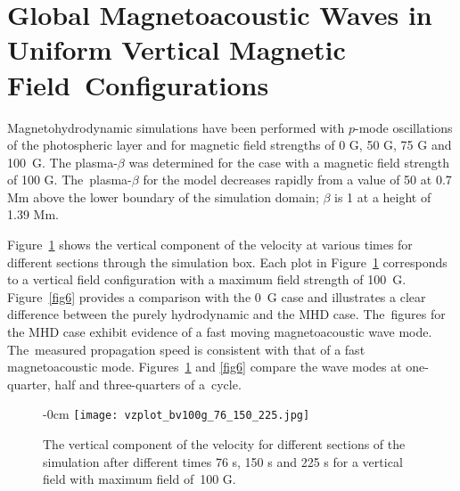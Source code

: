 \documentclass[physics,article,accept,pdftex,moreauthors]{Definitions/mdpi}
\begin{document}
\section{Global Magnetoacoustic Waves in Uniform Vertical Magnetic Field~Configurations}

Magnetohydrodynamic simulations have been performed with $p$-mode oscillations of the photospheric layer and for magnetic field strengths of 0 G, 50 G, 75 G and 100~G. The plasma-$\beta$ was determined for the case with a magnetic field strength of 100 G. The~plasma-$\beta$ for the model decreases rapidly from a value of 50 at 0.7 Mm above the lower boundary of the simulation domain; $\beta$ is 1 at a height of 1.39 Mm.  



 Figure~\ref{fig5} %
 shows the vertical component of the velocity at various times for different sections through the simulation box. Each plot in  Figure~\ref{fig5} %
 corresponds to a vertical field configuration with a maximum field strength of 100~G. Figure~\ref{fig6} provides a comparison with the 0~G case and %
 illustrates a clear difference between the purely hydrodynamic and the MHD case. The~figures for the MHD case exhibit evidence of a fast moving magnetoacoustic wave mode. The~measured propagation speed is consistent with that of a fast magnetoacoustic mode. Figures~\ref{fig5} and \ref{fig6} compare the wave modes at one-quarter, half and three-quarters of a~cycle. 
 
 \begin{figure}[H]

\begin{adjustwidth}{-\extralength}{0cm}
\centering %
\texttt{[image: vzplot\_bv100g\_76\_150\_225.jpg]}
\end{adjustwidth}
\caption{{The vertical} %
component of the velocity for different sections of the simulation after different times 76 s, 150 s and 225 s for a vertical field with maximum field of~100 G.\label{fig5}}
\end{figure}
\end{document}
